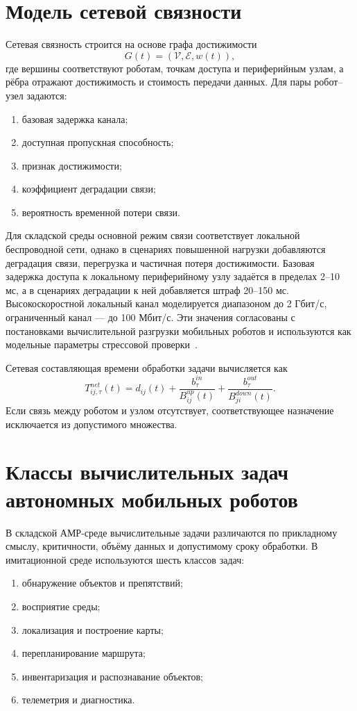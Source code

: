 \section{Модель сетевой связности}

Сетевая связность строится на основе графа достижимости
\[
G(t) = (\mathcal{V}, \mathcal{E}, w(t)),
\]
где вершины соответствуют роботам, точкам доступа и периферийным узлам, а рёбра отражают достижимость и стоимость передачи данных. Для пары робот--узел задаются:
\begin{enumerate}
	\item базовая задержка канала;
	\item доступная пропускная способность;
	\item признак достижимости;
	\item коэффициент деградации связи;
	\item вероятность временной потери связи.
\end{enumerate}

Для складской среды основной режим связи соответствует локальной беспроводной сети, однако в сценариях повышенной нагрузки добавляются деградация связи, перегрузка и частичная потеря достижимости. Базовая задержка доступа к локальному периферийному узлу задаётся в пределах 2--10 мс, а в сценариях деградации к ней добавляется штраф 20--150 мс. Высокоскоростной локальный канал моделируется диапазоном до 2 Гбит/с, ограниченный канал --- до 100 Мбит/с. Эти значения согласованы с постановками вычислительной разгрузки мобильных роботов и используются как модельные параметры стрессовой проверки~\cite{Baruffa2025AMRResourceAssignment}.

Сетевая составляющая времени обработки задачи вычисляется как
\[
T^{net}_{ij,\tau}(t)
=
d_{ij}(t)
+
\frac{b^{in}_{\tau}}{B^{up}_{ij}(t)}
+
\frac{b^{out}_{\tau}}{B^{down}_{ji}(t)}.
\]
Если связь между роботом и узлом отсутствует, соответствующее назначение исключается из допустимого множества.

\section{Классы вычислительных задач автономных мобильных роботов}

В складской АМР-среде вычислительные задачи различаются по прикладному смыслу, критичности, объёму данных и допустимому сроку обработки. В имитационной среде используются шесть классов задач:
\begin{enumerate}
	\item обнаружение объектов и препятствий;
	\item восприятие среды;
	\item локализация и построение карты;
	\item перепланирование маршрута;
	\item инвентаризация и распознавание объектов;
	\item телеметрия и диагностика.
\end{enumerate}

